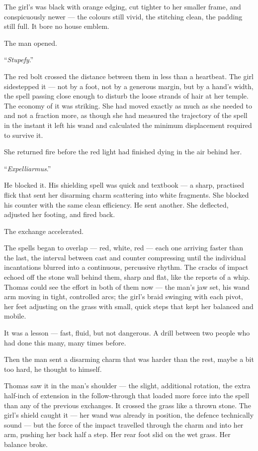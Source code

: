 The girl's was black with orange edging, cut tighter to her smaller frame, and conspicuously newer --- the colours still vivid, the stitching clean, the padding still full. It bore no house emblem.

The man opened.

\enquote{\textit{Stupefy}.}

The red bolt crossed the distance between them in less than a heartbeat. The girl sidestepped it --- not by a foot, not by a generous margin, but by a hand's width, the spell passing close enough to disturb the loose strands of hair at her temple. The economy of it was striking. She had moved exactly as much as she needed to and not a fraction more, as though she had measured the trajectory of the spell in the instant it left his wand and calculated the minimum displacement required to survive it.

She returned fire before the red light had finished dying in the air behind her.

\enquote{\textit{Expelliarmus}.}

He blocked it. His shielding spell was quick and textbook --- a sharp, practised flick that sent her disarming charm scattering into white fragments. She blocked his counter with the same clean efficiency. He sent another. She deflected, adjusted her footing, and fired back.

The exchange accelerated.

The spells began to overlap --- red, white, red --- each one arriving faster than the last, the interval between cast and counter compressing until the individual incantations blurred into a continuous, percussive rhythm. The cracks of impact echoed off the stone wall behind them, sharp and flat, like the reports of a whip. Thomas could see the effort in both of them now --- the man's jaw set, his wand arm moving in tight, controlled arcs; the girl's braid swinging with each pivot, her feet adjusting on the grass with small, quick steps that kept her balanced and mobile.

It was a lesson --- fast, fluid, but not dangerous. A drill between two people who had done this many, many times before.

Then the man sent a disarming charm that was harder than the rest, maybe a bit too hard, he thought to himself.

Thomas saw it in the man's shoulder --- the slight, additional rotation, the extra half-inch of extension in the follow-through that loaded more force into the spell than any of the previous exchanges. It crossed the grass like a thrown stone. The girl's shield caught it --- her wand was already in position, the defence technically sound --- but the force of the impact travelled through the charm and into her arm, pushing her back half a step. Her rear foot slid on the wet grass. Her balance broke.

